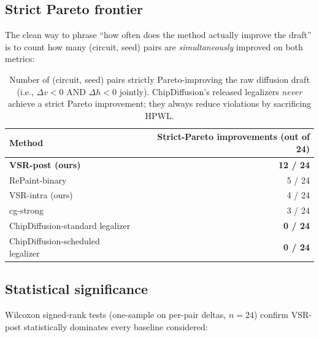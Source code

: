 \documentclass{article}
\begin{document}
\begin{table}[h]
\centering
\scriptsize

\caption{Per-circuit Δviolation and ΔHPWL means (\,$\pm$\,std), 4 seeds each.
Negative is improvement.  VSR-post is the only method with consistent
positive (\,fewer violations\,) results across all 6 circuits without
catastrophically inflating HPWL.}
\label{tab:main}
\end{table}

\subsection{Strict Pareto frontier}

The clean way to phrase ``how often does the method actually improve the
draft'' is to count how many (circuit, seed) pairs are
\emph{simultaneously} improved on both metrics:
\begin{table}[h]
\centering
\small
\begin{tabular}{lr}
\toprule
Method & Strict-Pareto improvements (out of 24) \\
\midrule
\textbf{VSR-post (ours)} & \textbf{12 / 24} \\
RePaint-binary & 5 / 24 \\
VSR-intra (ours) & 4 / 24 \\
cg-strong & 3 / 24 \\
ChipDiffusion-standard legalizer & \textbf{0 / 24} \\
ChipDiffusion-scheduled legalizer & \textbf{0 / 24} \\
\bottomrule
\end{tabular}
\caption{Number of (circuit, seed) pairs strictly Pareto-improving the raw
diffusion draft (i.e., $\Delta v < 0$ AND $\Delta h < 0$ jointly).  ChipDiffusion's released legalizers \emph{never} achieve a strict
Pareto improvement; they always reduce violations by sacrificing HPWL.}
\label{tab:strict_pareto}
\end{table}

\subsection{Statistical significance}

Wilcoxon signed-rank tests (one-sample on per-pair deltas, $n=24$) confirm
VSR-post statistically dominates every baseline considered:
\begin{table}[h]
\centering
\small

\caption{Paired Wilcoxon signed-rank tests, $n=24$ (circuit, seed) pairs.
$^{***}$ denotes $p<10^{-3}$.  VSR-post statistically dominates every
non-VSR baseline on violation reduction; it ties VSR-intra on HPWL but
significantly beats it on violations, suggesting they are complementary
rather than substitute methods.}
\label{tab:wilcoxon}
\end{table}
\end{document}
